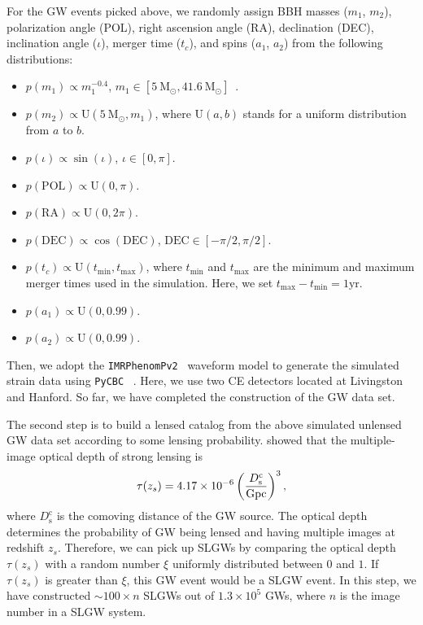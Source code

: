 \documentclass[fleqn,usenatbib]{mnras}
\begin{document}
For the GW events picked above, we randomly assign BBH masses ($m_1$, $m_2$), polarization angle (POL), right ascension angle (RA), declination (DEC), inclination angle ($\iota$), merger time ($t_c$), and spins ($a_1$, $a_2$) from the following distributions:
\begin{itemize}
\item [a)]
$p(m_1)\propto m_1^{-0.4}$, $m_1 \in [5~\mathrm{M}_\odot, 41.6~\mathrm{M}_\odot]$~\citep{LIGOScientific:2018jsj}.
\item [b)]
$p(m_2)\propto \mathrm{U}(5~\mathrm{M}_\odot, m_1)$, where $\mathrm{U}(a, b)$ stands for a uniform distribution from $a$ to $b$.
\item [c)]
$p(\iota)\propto \sin(\iota)$, $\iota \in  [0, \pi]$.
\item [d)]
$p(\mathrm{POL})\propto \mathrm{U}(0,\pi)$.
\item [e)]
$p(\mathrm{RA})\propto \mathrm{U}(0,2\pi)$.
\item [f)]
$p(\mathrm{DEC})\propto \cos(\mathrm{DEC})$, $\mathrm{DEC} \in [-\pi/2, \pi/2]$.
\item [g)]
$p(t_c)\propto \mathrm{U}(t_\mathrm{min}, t_\mathrm{max})$, where $t_\mathrm{min}$ and $t_\mathrm{max}$ are the minimum and maximum merger times used in the simulation. Here, we set $t_\mathrm{max}-t_\mathrm{min}=1\mathrm{yr}$.
\item [h)]
$p(a_1)\propto \mathrm{U}(0, 0.99)$.
\item [i)]
$p(a_2)\propto \mathrm{U}(0, 0.99)$.
\end{itemize}
Then, we adopt the \texttt{IMRPhenomPv2}~\citep{Hannam:2013oca, 2020ascl.soft12021L} waveform model to generate the simulated strain data using \texttt{PyCBC}~\citep{alex_nitz_2022_6324278} .
Here, we use two CE detectors located at Livingston and Hanford.
So far, we have completed the construction of the GW data set.

The second step is to build a lensed catalog from the above simulated unlensed GW data set according to some lensing probability.
\citet{Haris:2018vmn} showed that the multiple-image optical depth of strong lensing is
\begin{equation}
\tau(z_s)=4.17 \times 10^{-6}\left(\frac{D_{\mathrm{s}}^{\mathrm{c}}}{\mathrm{Gpc}}\right)^{3} \\,
\end{equation}
where $D_{\mathrm{s}}^{\mathrm{c}}$ is the comoving distance of the GW source.
The optical depth determines the probability of GW being lensed and having multiple images at redshift $z_s$.
Therefore, we can pick up SLGWs by comparing the optical depth $\tau(z_s)$ with a random number $\xi$ uniformly distributed between $0$ and $1$.
If $\tau(z_s)$ is greater than $\xi$, this GW event would be a SLGW event.
In this step, we have constructed $\sim 100\times n$ SLGWs out of $1.3\times 10^5$ GWs, where $n$ is the image number in a SLGW system.
\end{document}
